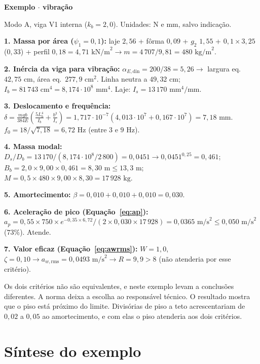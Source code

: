 \documentclass[11pt,a4paper]{article}
\newcommand{\caixaexemplo}[2]{%
  \par\vspace{6pt}\noindent\colorbox{examplebg}{%
    \parbox{\dimexpr\linewidth-2\fboxsep\relax}{%
      \vspace{4pt}\textbf{\color{exampleaccent}#1}\par\vspace{3pt}#2\vspace{4pt}%
    }%
  }\par\vspace{6pt}%
}
\begin{document}
\caixaexemplo{Exemplo $\cdot$ vibração}{%
Modo A, viga V1 interna ($k_b = 2{,}0$). Unidades: N e mm, salvo indicação.\par\vspace{3pt}
\textbf{1. Massa por área ($\psi_1 = 0{,}1$):} laje $2{,}56$ + fôrma $0{,}09$ + $g_2$ $1{,}55$ + $0{,}1 \times 3{,}25$ ($0{,}33$) + perfil $0{,}18 = 4{,}71\text{ kN/m}^2 \rightarrow m = 4\,707/9{,}81 = 480\text{ kg/m}^2$.\par
\textbf{2. Inércia da viga para vibração:} $\alpha_{E,\text{din}} = 200/38 = 5{,}26 \rightarrow$ largura eq.\ $42{,}75\text{ cm}$, área eq.\ $277{,}9\text{ cm}^2$. Linha neutra a $49{,}32\text{ cm}$; $I_b = 81\,743\text{ cm}^4 = 8{,}174\cdot 10^8\text{ mm}^4$. Laje: $I_s = 13\,170\text{ mm}^4/\text{mm}$.\par
\textbf{3. Deslocamento e frequência:} $\delta = \frac{m g b}{384 E}\left(\frac{5 L_b^4}{I_b} + \frac{b^3}{I_s}\right) = 1{,}717\cdot 10^{-7}(4{,}013\cdot 10^7 + 0{,}167\cdot 10^7) = 7{,}18\text{ mm}$. $f_0 = 18/\sqrt{7{,}18} = 6{,}72\text{ Hz}$ (entre $3$ e $9\text{ Hz}$).\par
\textbf{4. Massa modal:} $D_s/D_b = 13\,170/(8{,}174\cdot 10^8/2\,800) = 0{,}0451 \rightarrow 0{,}0451^{0{,}25} = 0{,}461$; $B_b = 2{,}0 \times 9{,}00 \times 0{,}461 = 8{,}30\text{ m} \le 13{,}3\text{ m}$; $M = 0{,}5 \times 480 \times 9{,}00 \times 8{,}30 = 17\,928\text{ kg}$.\par
\textbf{5. Amortecimento:} $\beta = 0{,}010 + 0{,}010 + 0{,}010 = 0{,}030$.\par
\textbf{6. Aceleração de pico (Equação~\ref{eq:ap}):} $a_p = 0{,}55 \times 750 \times e^{-0{,}35 \times 6{,}72}/(2 \times 0{,}030 \times 17\,928) = 0{,}0365\text{ m/s}^2 \le 0{,}050\text{ m/s}^2$ ($73\%$). Atende.\par
\textbf{7. Valor eficaz (Equação~\ref{eq:awrms}):} $W = 1{,}0$, $\zeta = 0{,}10 \rightarrow a_{w,\text{rms}} = 0{,}0493\text{ m/s}^2 \rightarrow R = 9{,}9 > 8$ (não atenderia por esse critério).}

Os dois critérios não são equivalentes, e neste exemplo levam a conclusões diferentes. A norma deixa a escolha ao responsável técnico. O resultado mostra que o piso está próximo do limite. Divisórias de piso a teto acrescentariam de $0{,}02$ a $0{,}05$ ao amortecimento, e com elas o piso atenderia aos dois critérios.

\section{Síntese do exemplo}
\end{document}
